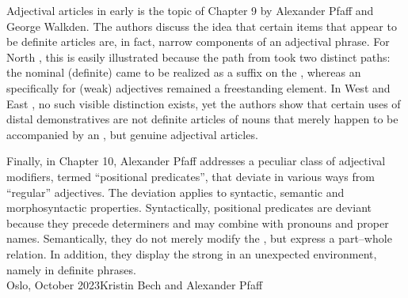 \begin{refsection}
Adjectival articles in early  is the topic of Chapter 9 by Alexander Pfaff and George Walkden. The authors discuss the idea that certain items that appear to be definite articles are, in fact, narrow components of an adjectival phrase. For North , this is easily illustrated because the  path from  took two distinct paths: the nominal (definite)  came to be realized as a suffix on the , whereas an  specifically for (weak) adjectives remained a freestanding element. In West and East , no such visible distinction exists, yet the authors show that certain  uses of distal demonstratives are not definite articles of nouns that merely happen to be accompanied by an , but genuine adjectival articles.  
  
Finally, in Chapter 10, Alexander Pfaff addresses a peculiar class of adjectival modifiers, termed “positional predicates”, that deviate in various ways from “regular” adjectives. The deviation applies to syntactic, semantic and morphosyntactic properties. Syntactically, positional predicates are deviant because they precede determiners and may combine with pronouns and proper names. Semantically, they do not merely modify the , but express a part--whole relation. In addition, they display the strong  in an unexpected environment, namely in definite  phrases.\bigskip\\
\noindent Oslo, October 2023\hfill Kristin Bech and Alexander Pfaff\hbox{}\\




\end{refsection}

